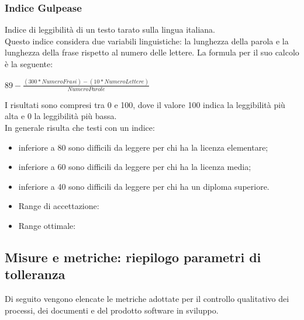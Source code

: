 \documentclass[a4paper,11pt]{article}
\begin{document}
\subsubsection{Indice Gulpease} Indice di leggibilità di un testo tarato sulla lingua italiana. \\
Questo indice considera due variabili linguistiche: la lunghezza della parola e la lunghezza della frase rispetto al numero delle lettere.
La formula per il suo calcolo è la seguente:\\
\begin{center}
\begin{math}
89 - \frac{(300 * NumeroFrasi) - (10 * NumeroLettere)}{NumeroParole}
\end{math}
\end{center}
I risultati sono compresi tra 0 e 100, dove il valore 100 indica la leggibilità più alta e 0 la leggibilità più bassa.\\
In generale risulta che testi con un indice:
\begin{itemize}
\item inferiore a 80 sono difficili da leggere per chi ha la licenza elementare;
\item inferiore a 60 sono difficili da leggere per chi ha la licenza media;
\item inferiore a 40 sono difficili da leggere per chi ha un diploma superiore.
\end{itemize}
\begin{itemize}
\item Range di accettazione: \begin{math}[50 - 100]\end{math}
\item Range ottimale: \begin{math}[60 - 100]\end{math}
\end{itemize}
\newpage
\subsection{Misure e metriche: riepilogo parametri di tolleranza}
Di seguito vengono elencate le metriche adottate per il controllo qualitativo dei processi, dei documenti e del prodotto software in sviluppo. 
\end{document}
